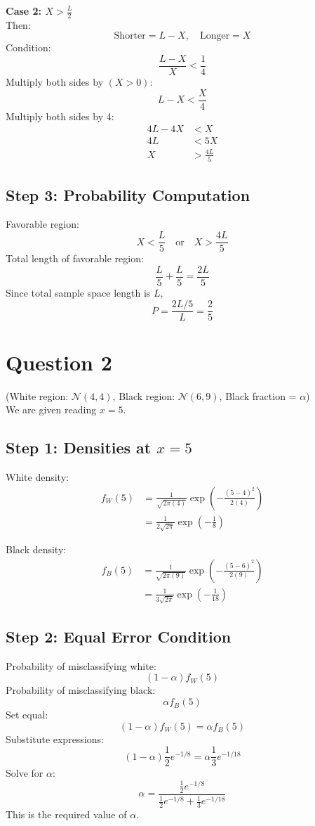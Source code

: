 \documentclass[11pt]{article}
\begin{document}
\textbf{Case 2: $X > \frac{L}{2}$} \\
Then:
\[
\text{Shorter} = L - X, \quad \text{Longer} = X
\]
Condition:
\[
\frac{L - X}{X} < \frac{1}{4}
\]
Multiply both sides by $(X > 0)$:
\[
L - X < \frac{X}{4}
\]
Multiply both sides by 4:
\begin{align*}
4L - 4X &< X \\
4L &< 5X \\
X &> \frac{4L}{5}
\end{align*}

\subsection*{Step 3: Probability Computation}
Favorable region:
\[
X < \frac{L}{5} \quad \text{or} \quad X > \frac{4L}{5}
\]
Total length of favorable region:
\[
\frac{L}{5} + \frac{L}{5} = \frac{2L}{5}
\]
Since total sample space length is $L$,
\[
P = \frac{2L/5}{L} = \frac{2}{5}
\]

\section*{Question 2}
(White region: $\mathcal{N}(4,4)$, Black region: $\mathcal{N}(6,9)$, Black fraction = $\alpha$) \\
We are given reading $x = 5$.



\subsection*{Step 1: Densities at $x=5$}
White density:
\begin{align*}
f_W(5) &= \frac{1}{\sqrt{2\pi(4)}} \exp\left(-\frac{(5-4)^2}{2(4)}\right) \\
&= \frac{1}{2\sqrt{2\pi}} \exp\left(-\frac{1}{8}\right)
\end{align*}

Black density:
\begin{align*}
f_B(5) &= \frac{1}{\sqrt{2\pi(9)}} \exp\left(-\frac{(5-6)^2}{2(9)}\right) \\
&= \frac{1}{3\sqrt{2\pi}} \exp\left(-\frac{1}{18}\right)
\end{align*}

\subsection*{Step 2: Equal Error Condition}
Probability of misclassifying white:
\[
(1-\alpha) f_W(5)
\]
Probability of misclassifying black:
\[
\alpha f_B(5)
\]
Set equal:
\[
(1-\alpha) f_W(5) = \alpha f_B(5)
\]
Substitute expressions:
\[
(1-\alpha)\frac{1}{2} e^{-1/8} = \alpha \frac{1}{3} e^{-1/18}
\]
Solve for $\alpha$:
\[
\alpha = \frac{\frac{1}{2}e^{-1/8}}{\frac{1}{2}e^{-1/8} + \frac{1}{3}e^{-1/18}}
\]
This is the required value of $\alpha$.
\end{document}
